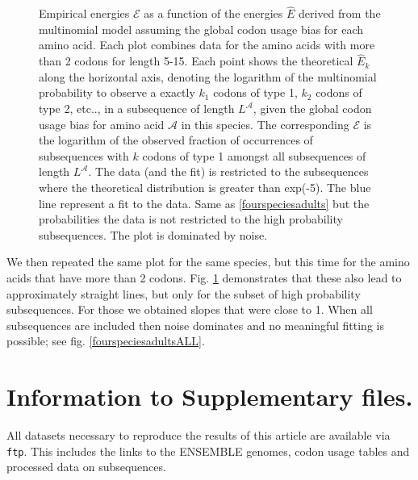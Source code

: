 \documentclass[a4paper,10pt]{paper}%
\begin{document}
%
%
\begin{figure}
\caption{\protect{} Empirical energies  $\mathcal E$ as a function of the energies  $\hat E$  derived from the multinomial model  assuming the global codon usage bias for each amino acid. Each plot combines data  for the amino acids with more than 2 codons  for length 5-15. Each point shows the theoretical $\hat E_k$ along the horizontal axis, denoting the logarithm of the multinomial probability to observe a exactly $k_1$ codons of type 1, $k_2$ codons of type 2, etc..,  in a subsequence of length $L^\mathcal A$, given the global codon usage bias for amino acid $\mathcal A$ in this species.  The corresponding $\mathcal E$ is the logarithm of the observed fraction of occurrences of subsequences with $k$ codons of type 1 amongst all subsequences of length $L^\mathcal A$. The data (and the fit) is restricted to the subsequences where the theoretical distribution is greater than exp(-5). The blue line represent a fit to the data. \protect{} Same as \ref{fourspeciesadults} but the probabilities  the data is not restricted to the high probability subsequences. The plot is dominated by noise.}
\label{example2}
\end{figure}
%
%
We then repeated the same  plot for the same species, but this time for the amino acids that have more than 2 codons. Fig. \ref{example2} demonstrates that these also lead to approximately straight lines, but only for the subset of high probability subsequences. For those we obtained slopes that were close to 1. When all subsequences are included then noise dominates and no meaningful fitting is possible; see fig. \ref{fourspeciesadultsALL}.


\section{Information to Supplementary files.}

All datasets necessary to reproduce the results of this article are available via {\tt ftp}. This includes the links to the ENSEMBLE genomes, codon usage tables and processed data on subsequences.
\end{document}
